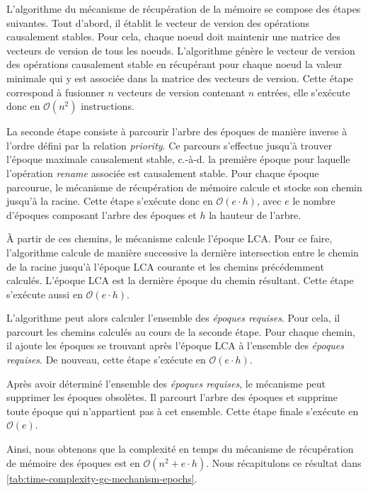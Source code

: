 \documentclass[12pt]{thesul}
\newcommand{\ie}{c.-à-d. }
\newcommand\bigO[1]{$\mathcal{O}(#1)$}
\begin{document}
L'algorithme du mécanisme de récupération de la mémoire se compose des étapes suivantes.
Tout d'abord, il établit le vecteur de version des opérations causalement stables.
Pour cela, chaque noeud doit maintenir une matrice des vecteurs de version de tous les noeuds.
L'algorithme génère le vecteur de version des opérations causalement stable en récupérant pour chaque noeud la valeur minimale qui y est associée dans la matrice des vecteurs de version.
Cette étape correspond à fusionner $n$ vecteurs de version contenant $n$ entrées, elle s'exécute donc en \bigO{n^2} instructions.

La seconde étape consiste à parcourir l'arbre des époques de manière inverse à l'ordre défini par la relation \emph{priority}.
Ce parcours s'effectue jusqu'à trouver l'époque maximale causalement stable, \ie la première époque pour laquelle l'opération \emph{rename} associée est causalement stable.
Pour chaque époque parcourue, le mécanisme de récupération de mémoire calcule et stocke son chemin jusqu'à la racine.
Cette étape s'exécute donc en \bigO{e \cdot h}, avec $e$ le nombre d'époques composant l'arbre des époques et $h$ la hauteur de l'arbre.

À partir de ces chemins, le mécanisme calcule l'époque \ac{LCA}.
Pour ce faire, l'algorithme calcule de manière successive la dernière intersection entre le chemin de la racine jusqu'à l'époque \ac{LCA} courante et les chemins précédemment calculés.
L'époque \ac{LCA} est la dernière époque du chemin résultant.
Cette étape s'exécute aussi en \bigO{e \cdot h}.

L'algorithme peut alors calculer l'ensemble des \emph{époques requises}.
Pour cela, il parcourt les chemins calculés au cours de la seconde étape.
Pour chaque chemin, il ajoute les époques se trouvant après l'époque \ac{LCA} à l'ensemble des \emph{époques requises}.
De nouveau, cette étape s'exécute en \bigO{e \cdot h}.

Après avoir déterminé l'ensemble des \emph{époques requises}, le mécanisme peut supprimer les époques obsolètes.
Il parcourt l'arbre des époques et supprime toute époque qui n'appartient pas à cet ensemble.
Cette étape finale s'exécute en \bigO{e}.

Ainsi, nous obtenons que la complexité en temps du mécanisme de récupération de mémoire des époques est en \bigO{n^2 + e \cdot h}.
Nous récapitulons ce résultat dans \autoref{tab:time-complexity-gc-mechanism-epochs}.
\end{document}
